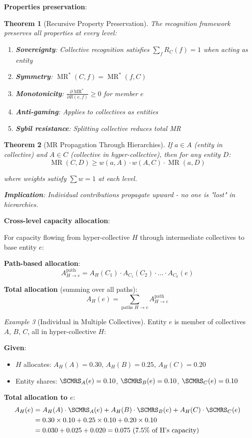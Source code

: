 \documentclass[11pt,a4paper]{article}
\newtheorem{theorem}{Theorem}[section]
\theoremstyle{definition}
\theoremstyle{remark}
\newtheorem{example}[theorem]{Example}
\DeclareMathOperator{\MR}{MR}
\begin{document}
\textbf{Properties preservation}:

\begin{theorem}[Recursive Property Preservation]
The recognition framework preserves all properties at every level:
\begin{enumerate}
\item \textbf{Sovereignty}: Collective recognition satisfies $\sum_f R_C(f) = 1$ when acting as entity
\item \textbf{Symmetry}: $\MR^*(C,f) = \MR^*(f,C)$
\item \textbf{Monotonicity}: $\frac{\partial \MR^*}{\partial R(e,f)} \ge 0$ for member $e$
\item \textbf{Anti-gaming}: Applies to collectives as entities
\item \textbf{Sybil resistance}: Splitting collective reduces total MR
\end{enumerate}
\end{theorem}

\begin{theorem}[MR Propagation Through Hierarchies]
If $a \in A$ (entity in collective) and $A \in C$ (collective in hyper-collective), then for any entity $D$:
\[ \MR(C,D) \ge w(a,A) \cdot w(A,C) \cdot \MR(a,D) \]

where weights satisfy $\sum w = 1$ at each level.

\textbf{Implication}: Individual contributions propagate upward - no one is "lost" in hierarchies.
\end{theorem}

\textbf{Cross-level capacity allocation}:

For capacity flowing from hyper-collective $H$ through intermediate collectives to base entity $e$:

\textbf{Path-based allocation}:
\[ A_{H \to e}^{\text{path}} = A_H(C_1) \cdot A_{C_1}(C_2) \cdot \ldots \cdot A_{C_k}(e) \]

\textbf{Total allocation} (summing over all paths):
\[ A_H(e) = \sum_{\text{paths } H \to e} A_{H \to e}^{\text{path}} \]

\begin{example}[Individual in Multiple Collectives]
Entity $e$ is member of collectives $A$, $B$, $C$, all in hyper-collective $H$:

\textbf{Given}:
\begin{itemize}
\item $H$ allocates: $A_H(A) = 0.30$, $A_H(B) = 0.25$, $A_H(C) = 0.20$
\item Entity shares: $\SCMRS_A(e) = 0.10$, $\SCMRS_B(e) = 0.10$, $\SCMRS_C(e) = 0.10$
\end{itemize}

\textbf{Total allocation to $e$}:
\begin{align*}
A_H(e) &= A_H(A) \cdot \SCMRS_A(e) + A_H(B) \cdot \SCMRS_B(e) + A_H(C) \cdot \SCMRS_C(e) \\
&= 0.30 \times 0.10 + 0.25 \times 0.10 + 0.20 \times 0.10 \\
&= 0.030 + 0.025 + 0.020 = 0.075 \text{ (7.5\% of H's capacity)}
\end{align*}
\end{example}
\end{document}
